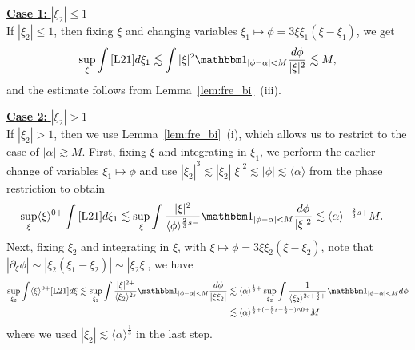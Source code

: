 \documentclass[%
11pt,  reqno]{amsart}
\newcommand{\5}{\textup{V}}
\newcommand{\noi}{\noindent}
\newcommand{\ind}{\mathbbm 1}
\newcommand{\les}{\lesssim}
\theoremstyle{remark}
\newcommand{\al}{\alpha}
\newcommand{\ges}{\gtrsim}
\newcommand{\jb}[1]
{\langle #1 \rangle}
\numberwithin{equation}{section}
\numberwithin{theorem}{section}
\begin{document}
\smallskip

\noi\underline{\textbf{Case 1:} $|\xi_2| \le 1$}\\
If $|\xi_2| \le 1$, then fixing $\xi$ and changing variables $\xi_1 \mapsto \phi = 3 \xi\xi_1(\xi-\xi_1)$, we get
\begin{align}
    \sup_\xi \int \eqref{L21} d\xi_1
    \les \int |\xi|^2 \ind_{|\phi - \al| < M } \frac{d\phi}{|\xi|^2 } \les M , 
\end{align}
and the estimate follows from Lemma~\ref{lem:fre_bi}~(iii).

\smallskip 

\noi\underline{\textbf{Case 2:} $|\xi_2| > 1$}\\
If $|\xi_2| >1$, then we use Lemma~\ref{lem:fre_bi}~(i), which allows us to restrict to the case of $|\al| \ges M$. 
First, fixing $\xi$ and integrating in $\xi_1$, we perform the earlier change of variables $\xi_1 \mapsto \phi$ and use $|\xi_2|^3 \les |\xi_2| |\xi|^2 \les |\phi| \les \jb{\al}$ from the phase restriction to obtain
\begin{align}
    \sup_{\xi} \jb{\xi}^{0+}\int \eqref{L21} d\xi_1
    &
    \les 
    \sup_\xi 
    \int \frac{|\xi|^{2}}{\jb{\phi}^{\frac23s-}} \ind_{|\phi-\al| < M} \frac{d\phi}{|\xi|^2} 
    \les \jb{\al}^{-\frac23 s+} M . 
\end{align}
Next, fixing $\xi_2$ and integrating in $\xi$, with $\xi \mapsto \phi = 3\xi \xi_2 (\xi-\xi_2)$, note that $|\partial_\xi \phi| \sim |\xi_2 (\xi_1-\xi_2)| \sim |\xi_2 \xi|$, we have
\begin{align}
\sup_{\xi_2} \int \jb{\xi}^{0+} \eqref{L21} d\xi 
\les \sup_{\xi_2} \int \frac{|\xi|^{2+}}{\jb{\xi_2}^{2s}} \ind_{|\phi-\al| < M} \frac{d\phi}{|\xi\xi_2|} 
&
\les 
\jb{\al}^{\frac12+}
\sup_{\xi_2} \int \frac{1}{\jb{\xi_2}^{2s+\frac32+}} \ind_{|\phi-\al| < M } d\phi
\\
&
\les
\jb{\al}^{\frac12 + (-\frac23 s - \frac12 -) \land 0 
+ } M
\end{align}
where we used $|\xi_2| \les \jb{\al}^{\frac13}$ in the last step. 
\end{document}

